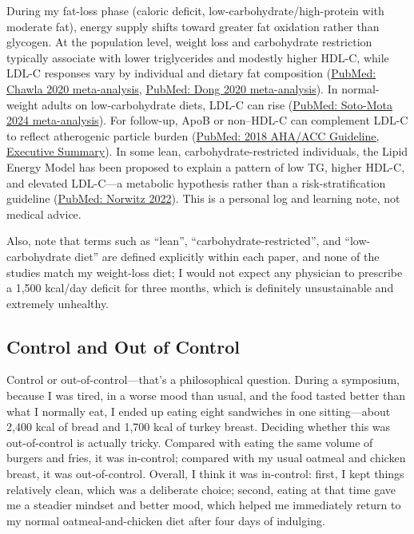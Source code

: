 During my fat-loss phase (caloric deficit, low-carbohydrate/high-protein with moderate fat), energy supply shifts toward greater fat oxidation rather than glycogen. At the population level, weight loss and carbohydrate restriction typically associate with lower triglycerides and modestly higher HDL-C, while LDL-C responses vary by individual and dietary fat composition (\href{https://pubmed.ncbi.nlm.nih.gov/33317019/}{PubMed: Chawla 2020 meta-analysis}, \href{https://pubmed.ncbi.nlm.nih.gov/31935216/}{PubMed: Dong 2020 meta-analysis}). In normal-weight adults on low-carbohydrate diets, LDL-C can rise (\href{https://pubmed.ncbi.nlm.nih.gov/38237807/}{PubMed: Soto-Mota 2024 meta-analysis}). For follow-up, ApoB or non–HDL-C can complement LDL-C to reflect atherogenic particle burden (\href{https://pubmed.ncbi.nlm.nih.gov/30423391/}{PubMed: 2018 AHA/ACC Guideline, Executive Summary}). In some lean, carbohydrate-restricted individuals, the Lipid Energy Model has been proposed to explain a pattern of low TG, higher HDL-C, and elevated LDL-C—a metabolic hypothesis rather than a risk-stratification guideline (\href{https://pubmed.ncbi.nlm.nih.gov/35629964/}{PubMed: Norwitz 2022}). This is a personal log and learning note, not medical advice.

Also, note that terms such as ``lean'', ``carbohydrate-restricted'', and ``low-carbohydrate diet'' are defined explicitly within each paper, and none of the studies match my weight-loss diet; I would not expect any physician to prescribe a 1,500 kcal/day deficit for three months, which is definitely unsustainable and extremely unhealthy.



\subsection{Control and Out of Control}

Control or out-of-control—that’s a philosophical question. During a symposium, because I was tired, in a worse mood than usual, and the food tasted better than what I normally eat, I ended up eating eight sandwiches in one sitting—about 2,400 kcal of bread and 1,700 kcal of turkey breast. Deciding whether this was out-of-control is actually tricky. Compared with eating the same volume of burgers and fries, it was in-control; compared with my usual oatmeal and chicken breast, it was out-of-control. Overall, I think it was in-control: first, I kept things relatively clean, which was a deliberate choice; second, eating at that time gave me a steadier mindset and better mood, which helped me immediately return to my normal oatmeal-and-chicken diet after four days of indulging.

